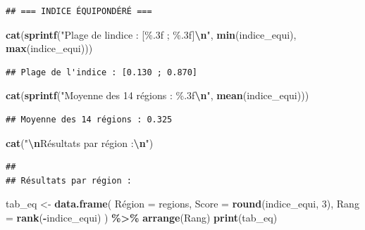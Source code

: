 \documentclass[
]{article}
\newenvironment{Shaded}{\begin{snugshade}}{\end{snugshade}}
\newcommand{\AttributeTok}[1]{\textcolor[rgb]{0.13,0.29,0.53}{#1}}
\newcommand{\DecValTok}[1]{\textcolor[rgb]{0.00,0.00,0.81}{#1}}
\newcommand{\FunctionTok}[1]{\textcolor[rgb]{0.13,0.29,0.53}{\textbf{#1}}}
\newcommand{\NormalTok}[1]{#1}
\newcommand{\OtherTok}[1]{\textcolor[rgb]{0.56,0.35,0.01}{#1}}
\newcommand{\SpecialCharTok}[1]{\textcolor[rgb]{0.81,0.36,0.00}{\textbf{#1}}}
\newcommand{\StringTok}[1]{\textcolor[rgb]{0.31,0.60,0.02}{#1}}
\begin{document}
\begin{verbatim}
## === INDICE ÉQUIPONDÉRÉ ===
\end{verbatim}

\begin{Shaded}
\begin{Highlighting}[]
\FunctionTok{cat}\NormalTok{(}\FunctionTok{sprintf}\NormalTok{(}\StringTok{"Plage de l\textquotesingle{}indice : [\%.3f ; \%.3f]}\SpecialCharTok{\textbackslash{}n}\StringTok{"}\NormalTok{, }\FunctionTok{min}\NormalTok{(indice\_equi), }\FunctionTok{max}\NormalTok{(indice\_equi)))}
\end{Highlighting}
\end{Shaded}

\begin{verbatim}
## Plage de l'indice : [0.130 ; 0.870]
\end{verbatim}

\begin{Shaded}
\begin{Highlighting}[]
\FunctionTok{cat}\NormalTok{(}\FunctionTok{sprintf}\NormalTok{(}\StringTok{"Moyenne des 14 régions : \%.3f}\SpecialCharTok{\textbackslash{}n}\StringTok{"}\NormalTok{, }\FunctionTok{mean}\NormalTok{(indice\_equi)))}
\end{Highlighting}
\end{Shaded}

\begin{verbatim}
## Moyenne des 14 régions : 0.325
\end{verbatim}

\begin{Shaded}
\begin{Highlighting}[]
\FunctionTok{cat}\NormalTok{(}\StringTok{"}\SpecialCharTok{\textbackslash{}n}\StringTok{Résultats par région :}\SpecialCharTok{\textbackslash{}n}\StringTok{"}\NormalTok{)}
\end{Highlighting}
\end{Shaded}

\begin{verbatim}
## 
## Résultats par région :
\end{verbatim}

\begin{Shaded}
\begin{Highlighting}[]
\NormalTok{tab\_eq }\OtherTok{\textless{}{-}} \FunctionTok{data.frame}\NormalTok{(}
\NormalTok{  Région }\OtherTok{=}\NormalTok{ regions,}
  \AttributeTok{Score  =} \FunctionTok{round}\NormalTok{(indice\_equi, }\DecValTok{3}\NormalTok{),}
  \AttributeTok{Rang   =} \FunctionTok{rank}\NormalTok{(}\SpecialCharTok{{-}}\NormalTok{indice\_equi)}
\NormalTok{) }\SpecialCharTok{\%\textgreater{}\%} \FunctionTok{arrange}\NormalTok{(Rang)}
\FunctionTok{print}\NormalTok{(tab\_eq)}
\end{Highlighting}
\end{Shaded}
\end{document}
